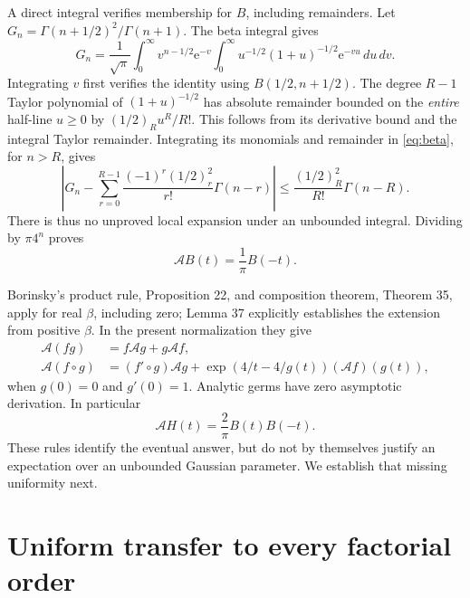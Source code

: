 \documentclass[11pt,letterpaper]{article}
\numberwithin{equation}{section}
\theoremstyle{remark}\newtheorem{remark}[theorem]{Remark}
\newcommand{\e}{\mathrm e}
\newcommand{\As}{\mathcal A}
\begin{document}
A direct integral verifies membership for $B$, including remainders. Let
$G_n=\Gamma(n+1/2)^2/\Gamma(n+1)$. The beta integral gives
\begin{equation}\label{eq:beta}
 G_n=\frac1{\sqrt\pi}\int_0^\infty v^{n-1/2}\e^{-v}
       \int_0^\infty u^{-1/2}(1+u)^{-1/2}\e^{-vu}\,du\,dv.
\end{equation}
Integrating $v$ first verifies the identity using $B(1/2,n+1/2)$. The degree $R-1$ Taylor polynomial of $(1+u)^{-1/2}$ has absolute remainder bounded on the \emph{entire} half-line $u\ge0$ by $(1/2)_R u^R/R!$. This follows from its derivative bound and the integral Taylor remainder. Integrating its monomials and remainder in \eqref{eq:beta}, for $n>R$, gives
\begin{equation}\label{eq:betarem}
 \left|G_n-\sum_{r=0}^{R-1}\frac{(-1)^r(1/2)_r^2}{r!}\Gamma(n-r)\right|
 \le\frac{(1/2)_R^2}{R!}\Gamma(n-R).
\end{equation}
There is thus no unproved local expansion under an unbounded integral. Dividing by $\pi4^n$ proves
\begin{equation}\label{eq:AB}
 \As B(t)=\frac1\pi B(-t).
\end{equation}

Borinsky's product rule, Proposition 22, and composition theorem, Theorem 35, apply for real $\beta$, including zero; Lemma 37 explicitly establishes the extension from positive $\beta$. In the present normalization they give
\begin{align}\label{eq:algebra}
 \As(fg)&=f\As g+g\As f,\\
 \As(f\circ g)&=(f'\circ g)\As g+
       \exp(4/t-4/g(t))(\As f)(g(t)),\label{eq:chain}
\end{align}
when $g(0)=0$ and $g'(0)=1$. Analytic germs have zero asymptotic derivation. In particular
\begin{equation}\label{eq:AH}
 \As H(t)=\frac2\pi B(t)B(-t).
\end{equation}
These rules identify the eventual answer, but do not by themselves justify an expectation over an unbounded Gaussian parameter. We establish that missing uniformity next.

\section{Uniform transfer to every factorial order}
\end{document}
